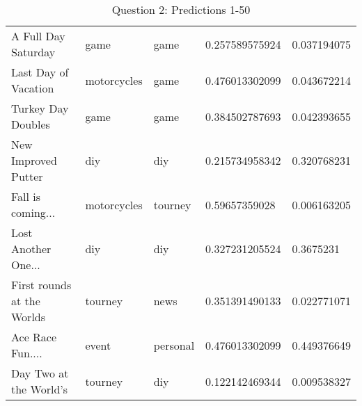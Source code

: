 \begin{table}[h!]
\begin{tabular}{| l | l | l | l | l |}
A Full Day Saturday  &  game  &  game  & 0.257589575924 & 0.037194075   \\
Last Day of Vacation  &  motorcycles  &  game  & 0.476013302099 & 0.043672214   \\
Turkey Day Doubles  &  game  &  game  & 0.384502787693 & 0.042393655   \\
New Improved Putter  &  diy  &  diy  & 0.215734958342 & 0.320768231   \\
Fall is coming...  &  motorcycles  &  tourney  & 0.59657359028 & 0.006163205   \\
Lost Another One...  &  diy  &  diy  & 0.327231205524 & 0.3675231   \\
First rounds at the Worlds  &  tourney  &  news  & 0.351391490133 & 0.022771071   \\
Ace Race Fun....  &  event  &  personal  & 0.476013302099 & 0.449376649   \\
Day Two at the World's  &  tourney  &  diy  & 0.122142469344 & 0.009538327   \\
\hline
\end{tabular}
\caption{Question 2: Predictions 1-50}
\label{tab:one}
\end{table}

